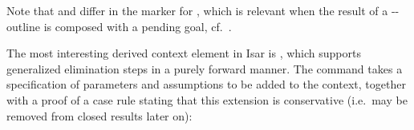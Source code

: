 \begin{isabellebody}
\begin{isamarkuptext}
  \medskip Note that \hyperlink{inference.discharge}{\mbox{}} and \hyperlink{inference.weak-discharge}{\mbox{}} differ in the marker for , which is
  relevant when the result of a \hyperlink{command.fix}{\mbox{}}-\hyperlink{command.assume}{\mbox{}}-\hyperlink{command.show}{\mbox{}} outline is composed with a pending goal,
  cf.\ .

  The most interesting derived context element in Isar is \hyperlink{command.obtain}{\mbox{}} \cite[\S5.3]{Wenzel-PhD}, which supports generalized
  elimination steps in a purely forward manner.  The \hyperlink{command.obtain}{\mbox{}}
  command takes a specification of parameters  and
  assumptions  to be added to the context, together
  with a proof of a case rule stating that this extension is
  conservative (i.e.\ may be removed from closed results later on):


\end{isamarkuptext}
\end{isabellebody}
